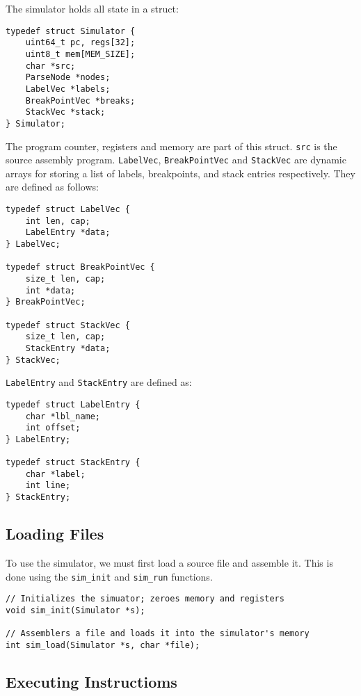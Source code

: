 \documentclass{article}
\begin{document}
The simulator holds all state in a struct:

\begin{verbatim}
typedef struct Simulator {
    uint64_t pc, regs[32];    
    uint8_t mem[MEM_SIZE];
    char *src; 
    ParseNode *nodes;
    LabelVec *labels;
    BreakPointVec *breaks;
    StackVec *stack;
} Simulator;
\end{verbatim}

The program counter, registers and memory are part of this struct. \texttt{src} is
the source assembly program. \texttt{LabelVec}, \texttt{BreakPointVec} and \texttt{StackVec}
are dynamic arrays for storing a list of labels, breakpoints, and stack entries respectively.
They are defined as follows:

\begin{verbatim}
typedef struct LabelVec {
    int len, cap;
    LabelEntry *data;
} LabelVec;

typedef struct BreakPointVec {
    size_t len, cap;
    int *data;
} BreakPointVec;

typedef struct StackVec {
    size_t len, cap;
    StackEntry *data;
} StackVec;
\end{verbatim}

\texttt{LabelEntry} and \texttt{StackEntry} are defined as:

\begin{verbatim}
typedef struct LabelEntry {
    char *lbl_name;
    int offset;
} LabelEntry;
    
typedef struct StackEntry {
    char *label;
    int line;
} StackEntry;
\end{verbatim}

\subsection{Loading Files}

To use the simulator, we must first load a source file and assemble it. This is 
done using the \texttt{sim\_init} and \texttt{sim\_run} functions.

\begin{verbatim}
// Initializes the simuator; zeroes memory and registers
void sim_init(Simulator *s);

// Assemblers a file and loads it into the simulator's memory
int sim_load(Simulator *s, char *file);
\end{verbatim}

\subsection{Executing Instructioms}
\end{document}
